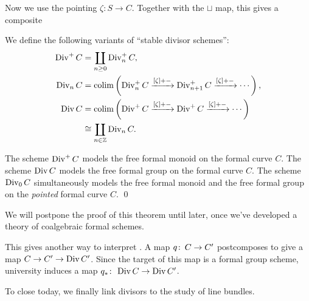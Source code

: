 Now we use the pointing $\zeta: S \to C$.  Together with the $\sqcup$ map, this gives a composite
\begin{center}
\end{center}

\begin{definition}\label{StableDivisorSchemeDefn}
We define the following variants of ``stable divisor schemes'':
\begin{align*}
\operatorname{Div}^+ C & = \coprod_{n \ge 0} \operatorname{Div}_n^+ C, \\
\operatorname{Div}_n C & = \operatorname{colim} \left( \operatorname{Div}_n^+ C \xrightarrow{[\zeta] + -} \operatorname{Div}_{n+1}^+ C \xrightarrow{[\zeta] + -} \cdots \right), \\
\operatorname{Div} C & = \operatorname{colim} \left( \operatorname{Div}^+ C \xrightarrow{[\zeta] + -} \operatorname{Div}^+ C \xrightarrow{[\zeta] + -} \cdots \right) \\
& \cong \coprod_{n \in \mathbb Z} \operatorname{Div}_n C.
\end{align*}
\end{definition}

\begin{theorem}
The scheme $\operatorname{Div}^+ C$ models the free formal monoid on the formal curve $C$.  The scheme $\operatorname{Div} C$ models the free formal group on the formal curve $C$.  The scheme $\operatorname{Div}_0 C$ simultaneously models the free formal monoid and the free formal group on the \emph{pointed} formal curve $C$. \qed {}
\end{theorem}
\noindent We will postpone the proof of this theorem until later, once we've developed a theory of coalgebraic formal schemes.

\begin{remark}
This gives another way to interpret .  A map $q\colon\thinspace C \to C'$ postcomposes to give a map $C \to C' \to \operatorname{Div} C'$.  Since the target of this map is a formal group scheme, university induces a map $q_*\colon\thinspace \operatorname{Div} C \to \operatorname{Div} C'$.
\end{remark}

To close today, we finally link divisors to the study of line bundles.

